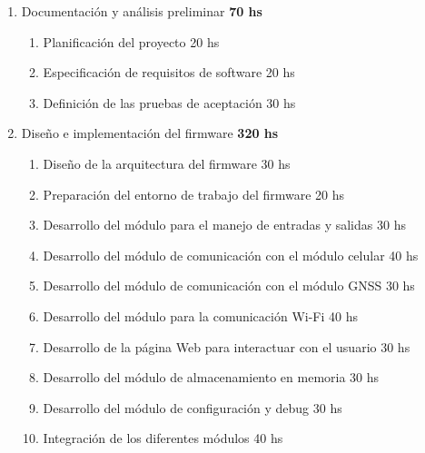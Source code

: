 \documentclass[
11pt, %
]{charter}
\begin{document}
\begin{enumerate}
\item Documentación y análisis preliminar								\hspace*{\fill}\textbf{70 hs}
	\begin{enumerate}
	\item Planificación del proyecto 									\hspace*{\fill}20 hs
	\item Especificación de requisitos de software 						\hspace*{\fill}20 hs
	\item Definición de las pruebas de aceptación						\hspace*{\fill}30 hs
	\end{enumerate}
\item Diseño e implementación del firmware								\hspace*{\fill}\textbf{320 hs}
	\begin{enumerate}
	\item Diseño de la arquitectura del firmware						\hspace*{\fill}30 hs
	\item Preparación del entorno de trabajo del firmware				\hspace*{\fill}20 hs
	\item Desarrollo del módulo para el manejo de entradas y salidas	\hspace*{\fill}30 hs
	\item Desarrollo del módulo de comunicación con el módulo celular	\hspace*{\fill}40 hs
	\item Desarrollo del módulo de comunicación con el módulo GNSS		\hspace*{\fill}30 hs
	\item Desarrollo del módulo para la comunicación Wi-Fi				\hspace*{\fill}40 hs
	\item Desarrollo de la página Web para interactuar con el usuario	\hspace*{\fill}30 hs
	\item Desarrollo del módulo de almacenamiento en memoria			\hspace*{\fill}30 hs
	\item Desarrollo del módulo de configuración y debug				\hspace*{\fill}30 hs
	\item Integración de los diferentes módulos							\hspace*{\fill}40 hs	

\end{enumerate}
\end{enumerate}
\end{document}
